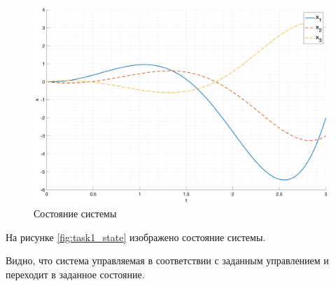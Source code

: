 \begin{figure}
    \centering
    \includegraphics[width=\textwidth]{media/plots/task2_states.png}
    \caption{Состояние системы}
    \label{fig:task2_state}
\end{figure}
На рисунке \ref{fig:task1_state} изображено состояние системы.

Видно, что система управляемая в соответствии с заданным управлением и переходит в заданное состояние. 

